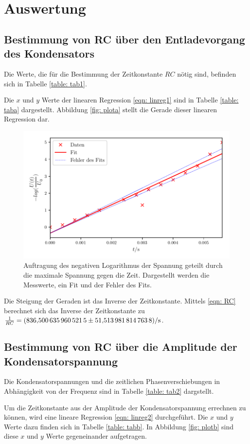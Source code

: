 \section{Auswertung}
\label{sec:Auswertung}


\subsection{Bestimmung von RC über den Entladevorgang des Kondensators}
Die Werte, die für die Bestimmung der Zeitkonstante $RC$ nötig sind, befinden sich in Tabelle \ref{table: tab1}. %

Die $x$ und $y$ Werte der linearen Regression \eqref{eqn: linreg1} sind in Tabelle \ref{table: taba} dargestellt.
Abbildung \ref{fig: plota} stellt die Gerade dieser linearen Regression dar.


\begin{figure}
  \centering
  \includegraphics{build/plota.pdf}
  \caption{Auftragung des negativen Logarithmus der Spannung geteilt durch die maximale Spannung gegen die Zeit.
  Dargestellt werden die Messwerte, ein Fit und der Fehler des Fits.} %
  \label{fig:plota}
\end{figure}

\noindent Die Steigung der Geraden ist das Inverse der Zeitkonstante. %
Mittels \eqref{eqn: RC} berechnet sich das Inverse der Zeitkonstante zu
$\frac{1}{RC} = \SI{836.5006359605215 \pm 51.5139818147638}{\per\second}$.

\subsection{Bestimmung von RC über die Amplitude der Kondensatorspannung}
Die Kondensatorspannungen und die zeitlichen Phasenverschiebungen in Abhängigkeit
von der Frequenz sind in Tabelle \ref{table: tab2} dargstellt.

Um die Zeitkonstante aus der Amplitude der Kondensatorspannung errechnen zu können, wird eine lineare Regression 
\eqref{eqn: linreg2} durchgeführt. Die $x$ und $y$ Werte dazu finden sich in Tabelle \ref{table: tabb}.
In Abbildung \ref{fig: plotb} sind diese $x$ und $y$ Werte gegeneinander aufgetragen.


